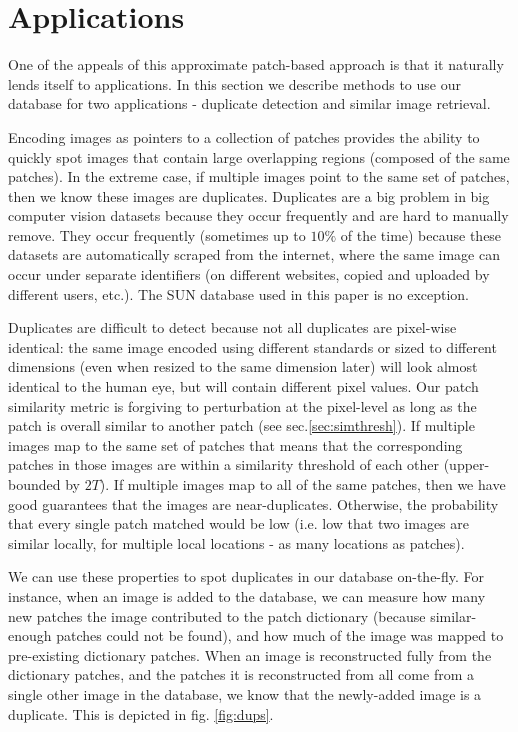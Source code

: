 \section{Applications}\label{sec:apps}

One of the appeals of this approximate patch-based approach
is that it naturally lends itself to applications. In this
section we describe methods to use our database for
two applications - duplicate detection and similar image retrieval.


Encoding images as pointers to a collection of patches provides the ability to quickly spot images that contain large overlapping regions (composed of the same patches). In the extreme case, if multiple images point to the same set of patches, then we know these images are duplicates. Duplicates are a big problem in big computer vision datasets because they occur frequently and are hard to manually remove. They occur frequently (sometimes up to $10\%$ of the time) because these datasets are automatically scraped from the internet, where the same image can occur under separate identifiers (on different websites, copied and uploaded by different users, etc.). The SUN database \cite{SUN} used in this paper is no exception.

Duplicates are difficult to detect because not all duplicates are pixel-wise identical: the same image encoded using different standards or sized to different dimensions (even when resized to the same dimension later) will look almost identical to the human eye, but will contain different pixel values. Our patch similarity metric is forgiving to perturbation at the pixel-level as long as the patch is overall similar to another patch (see sec.\ref{sec:simthresh}). If multiple images map to the same set of patches that means that the corresponding patches in those images are within a similarity threshold of each other (upper-bounded by $2T$). If multiple images map to all of the same patches, then we have good guarantees that the images are near-duplicates. Otherwise, the probability that every single patch matched would be low (i.e. low that two images are similar locally, for multiple local locations - as many locations as patches). 

We can use these properties to spot duplicates in our database on-the-fly. For instance, when an image is added to the database, we can measure how many new patches the image contributed to the patch dictionary (because similar-enough patches could not be found), and how much of the image was mapped to pre-existing dictionary patches. When an image is reconstructed fully from the dictionary patches, and the patches it is reconstructed from all come from a single other image in the database, we know that the newly-added image is a duplicate. This is depicted in fig. \ref{fig:dups}. 

